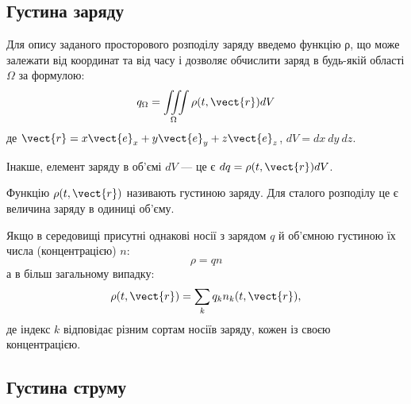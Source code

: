 \subsection*{Густина заряду}


Для опису заданого просторового розподілу заряду
введемо функцію ρ, що може залежати від координат та від часу і дозволяє
обчислити заряд в будь-якій області $\Omega$ за формулою:
\begin{equation}\label{eq:q}
    q_{\Omega} = \iiint\limits_{\Omega} \rho(t, \vect{r}) dV
\end{equation}
де $\vect{r} = x\vect{e}_x + y\vect{e}_y + z\vect{e}_z$, $dV=dx\ dy\ dz$.

Інакше, елемент заряду в об’ємі $dV$ --- це є $dq = \rho(t, \vect{r}) dV$.

Функцію $\rho(t, \vect{r})$ називають густиною заряду. Для сталого розподілу це є
величина заряду в одиниці об’єму.

Якщо в середовищі присутні однакові носії з зарядом $q$ й об’ємною
густиною їх числа (концентрацією) $n$:
\begin{equation}
    \rho = qn
\end{equation}
а в більш загальному випадку:
\begin{equation}
    \rho(t, \vect{r}) = \sum\limits_k q_kn_k(t, \vect{r}),
\end{equation}
де індекс $k$ відповідає різним сортам носіїв заряду, кожен із своєю концентрацією.


\subsection*{Густина струму}


